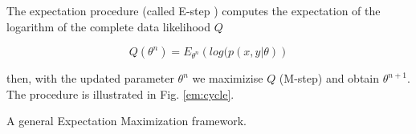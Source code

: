 \documentclass[mscthesis]{usiinfthesis}
\begin{document}
The expectation procedure (called E-step ) computes the expectation of the logarithm of the complete data likelihood $Q$

\[
Q(\theta^n) = E_{\theta^n} \left( log(p(x, y | \theta) \right)
\]

then, with the updated parameter $\theta^n$ we maximizise $Q$ (M-step) and obtain $\theta^{n+1}$. The procedure is illustrated in Fig. \ref{em:cycle}. 

\begin{algorithm}[h]
  \label{em:cycle}
  \caption{A general Expectation Maximization framework.}
\end{algorithm}


%
%


%
%
%
%


\end{document}
